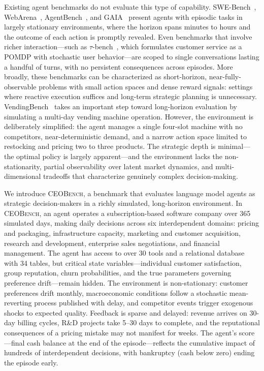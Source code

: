 Existing agent benchmarks do not evaluate this type of capability.
SWE-Bench~\citep{jimenez2024swebench}, WebArena~\citep{zhou2024webarena}, AgentBench~\citep{liu2024agentbench}, and GAIA~\citep{mialon2024gaia} present agents with episodic tasks in largely stationary environments, where the horizon spans minutes to hours and the outcome of each action is promptly revealed.
Even benchmarks that involve richer interaction---such as $\tau$-bench~\citep{yao2024taubench}, which formulates customer service as a POMDP with stochastic user behavior---are scoped to single conversations lasting a handful of turns, with no persistent consequences across episodes.
More broadly, these benchmarks can be characterized as short-horizon, near-fully-observable problems with small action spaces and dense reward signals: settings where reactive execution suffices and long-term strategic planning is unnecessary.
%
VendingBench~\citep{backlund2025vendingbench} takes an important step toward long-horizon evaluation by simulating a multi-day vending machine operation.
However, the environment is deliberately simplified: the agent manages a single four-slot machine with no competitors, near-deterministic demand, and a narrow action space limited to restocking and pricing two to three products.
The strategic depth is minimal---the optimal policy is largely apparent---and the environment lacks the non-stationarity, partial observability over latent market dynamics, and multi-dimensional tradeoffs that characterize genuinely complex decision-making.

We introduce \textsc{CEOBench}, a benchmark that evaluates language model agents as strategic decision-makers in a richly simulated, long-horizon environment.
In \textsc{CEOBench}, an agent operates a subscription-based software company over 365 simulated days, making daily decisions across six interdependent domains: pricing and packaging, infrastructure capacity, marketing and customer acquisition, research and development, enterprise sales negotiations, and financial management.
The agent has access to over 30 tools and a relational database with 34 tables, but critical state variables---individual customer satisfaction, group reputation, churn probabilities, and the true parameters governing preference drift---remain hidden.
The environment is non-stationary: customer preferences drift monthly, macroeconomic conditions follow a stochastic mean-reverting process published with delay, and competitor events trigger exogenous shocks to expected quality.
Feedback is sparse and delayed: revenue arrives on 30-day billing cycles, R\&D projects take 5--30 days to complete, and the reputational consequences of a pricing mistake may not manifest for weeks.
The agent's score---final cash balance at the end of the episode---reflects the cumulative impact of hundreds of interdependent decisions, with bankruptcy (cash below zero) ending the episode early.


